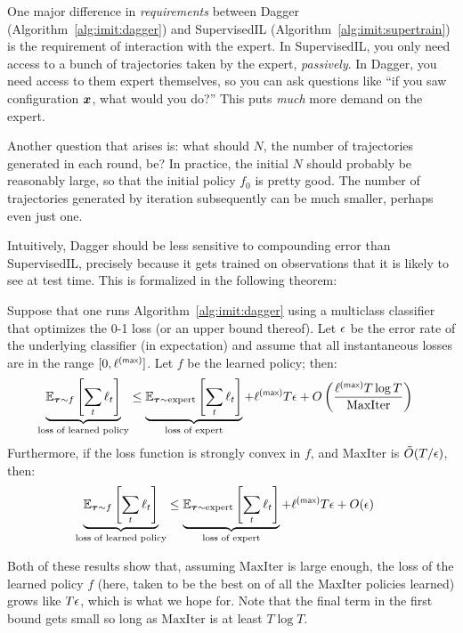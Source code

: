 One major difference in \emph{requirements} between Dagger (Algorithm~\ref{alg:imit:dagger}) and SupervisedIL (Algorithm~\ref{alg:imit:supertrain}) is the requirement of interaction with the expert.
In SupervisedIL, you only need access to a bunch of trajectories taken by the expert, \emph{passively}.
In Dagger, you need access to them expert themselves, so you can ask questions like ``if you saw configuration ${\boldsymbol{x}}$, what would you do?''
This puts \emph{much} more demand on the expert.

Another question that arises is: what should $N$, the number of trajectories generated in each round, be?
In practice, the initial $N$ should probably be reasonably large, so that the initial policy $f_0$ is pretty good.
The number of trajectories generated by iteration subsequently can be much smaller, perhaps even just one.

Intuitively, Dagger should be less sensitive to compounding error than SupervisedIL, precisely because it gets trained on observations that it is likely to see at test time.
This is formalized in the following theorem:

\begin{theorem}
  Suppose that one runs Algorithm~\ref{alg:imit:dagger} using a multiclass classifier that optimizes the 0-1 loss (or an upper bound thereof).
  Let $\epsilon$ be the error rate of the underlying classifier (in expectation) and assume that all instantaneous losses are in the range $[0, \ell\xth{max}]$.
  Let $f$ be the learned policy; then:
  \begin{align}
    \underbrace{\Ep_{\vt \sim f}\left[\sum_t \ell_t\right]}_{\text{loss of learned policy}}
    & \leq
    \underbrace{\Ep_{\vt \sim \text{expert}}\left[\sum_t \ell_t\right]}_{\text{loss of expert}}
      + \ell\xth{max} T \ep
      + O\left( \frac {\ell\xth{max} T \log T} {\text{MaxIter}} \right)
  \end{align}
  Furthermore, if the loss function is strongly convex in $f$, and $\text{MaxIter}$ is $\tilde O(T/\epsilon)$, then:
  \begin{align}
    \underbrace{\Ep_{\vt \sim f}\left[\sum_t \ell_t\right]}_{\text{loss of learned policy}}
    & \leq
    \underbrace{\Ep_{\vt \sim \text{expert}}\left[\sum_t \ell_t\right]}_{\text{loss of expert}}
      + \ell\xth{max} T \ep
      + O(\ep)
  \end{align}
\end{theorem}

Both of these results show that, assuming $\text{MaxIter}$ is large enough, the loss of the learned policy $f$ (here, taken to be the best on of all the $\text{MaxIter}$ policies learned) grows like $T\epsilon$, which is what we hope for.
Note that the final term in the first bound gets small so long as $\text{MaxIter}$ is at least $T \log T$.

